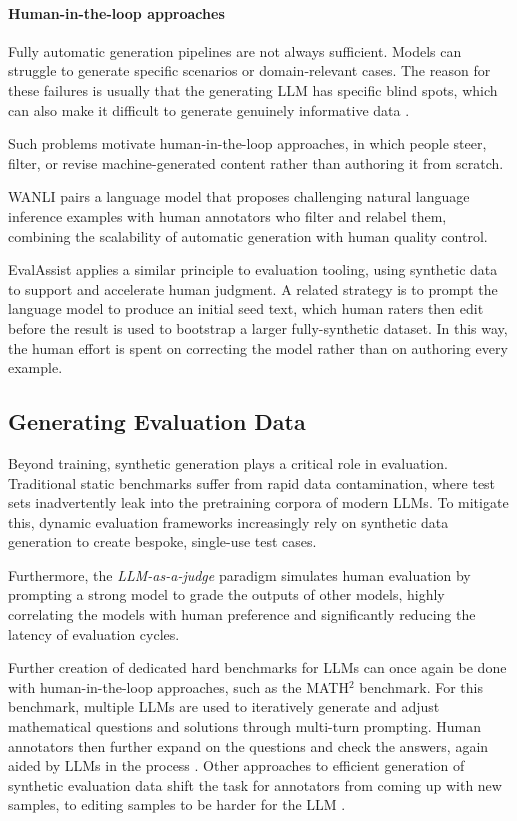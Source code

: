 \paragraph{Human-in-the-loop approaches}
Fully automatic generation pipelines are not always sufficient. Models can struggle to generate specific scenarios or domain-relevant cases. The reason for these failures is usually that the generating LLM has specific blind spots, which can also make it difficult to generate genuinely informative data \citep{lippmann2024illuminatingblindspotslanguage}.

Such problems motivate human-in-the-loop approaches, in which people steer, filter, or revise machine-generated content rather than authoring it from scratch. 

WANLI \citep{liu-etal-2022-wanli} pairs a language model that proposes challenging natural language inference examples with human annotators who filter and relabel them, combining the scalability of automatic generation with human quality control.

EvalAssist \citep{santillan-cooper-etal-2025-synthetic} applies a similar principle to evaluation tooling, using synthetic data to support and accelerate human judgment. A related strategy is to prompt the language model to produce an initial seed text, which human raters then edit before the result is used to bootstrap a larger fully-synthetic dataset. In this way, the human effort is spent on correcting the model rather than on authoring every example.



\subsection{Generating Evaluation Data}
Beyond training, synthetic generation plays a critical role in evaluation. Traditional static benchmarks suffer from rapid data contamination, where test sets inadvertently leak into the  pretraining corpora of modern LLMs. To mitigate this, dynamic evaluation frameworks \citep{kiela-etal-2021-dynabench} increasingly rely on synthetic data generation to create bespoke, single-use test cases. 

Furthermore, the {\em LLM-as-a-judge} paradigm \citep{zheng2024judging} simulates human evaluation by prompting a strong model to grade the outputs of other models, highly correlating the models with human preference and significantly reducing the latency of evaluation cycles.

Further creation of dedicated hard benchmarks for LLMs can once again be done with human-in-the-loop approaches, such as the MATH$^2$ benchmark. For this benchmark, multiple LLMs are used to iteratively generate and adjust mathematical questions and solutions through multi-turn prompting. Human annotators then further expand on the questions and check the answers, again aided by LLMs in the process \citep{shah2024ai}. Other approaches to efficient generation of synthetic evaluation data shift the task for annotators from coming up with new samples, to editing samples to be harder for the LLM \citep{yuan2021synthbio}.

